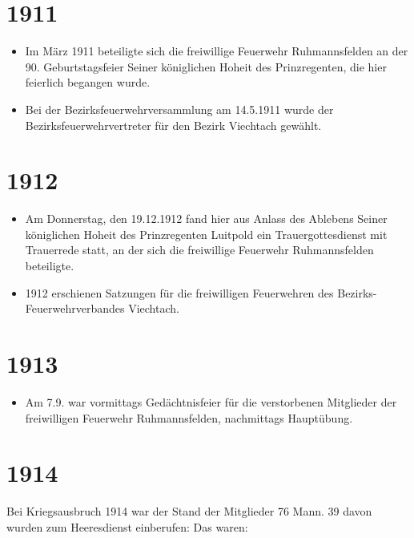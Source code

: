\documentclass[12pt,a4paper]{book}
\begin{document}
\section*{1911}

\begin{itemize}
\item Im März 1911 beteiligte sich die freiwillige Feuerwehr Ruhmannsfelden an
der 90. Geburtstagsfeier Seiner königlichen Hoheit des Prinzregenten, die hier
feierlich begangen wurde.

\item Bei der Bezirksfeuerwehrversammlung am 14.5.1911 wurde der
Bezirksfeuerwehrvertreter für den Bezirk Viechtach gewählt.
\end{itemize}

\section*{1912}

\begin{itemize}
\item Am Donnerstag, den 19.12.1912 fand hier aus Anlass des Ablebens Seiner
königlichen Hoheit des Prinzregenten Luitpold ein Trauergottesdienst mit
Trauerrede statt, an der sich die freiwillige Feuerwehr Ruhmannsfelden
beteiligte.

\item 1912 erschienen Satzungen für die freiwilligen Feuerwehren des
Bezirks-Feuerwehrverbandes Viechtach.
\end{itemize}

\section*{1913}

\begin{itemize}
\item Am 7.9. war vormittags Gedächtnisfeier für die verstorbenen Mitglieder der
freiwilligen Feuerwehr Ruhmannsfelden, nachmittags Hauptübung.
\end{itemize}

\section*{1914}

Bei Kriegsausbruch 1914 war der Stand der Mitglieder 76 Mann. 39 davon wurden
zum Heeresdienst einberufen: Das waren:
\end{document}
